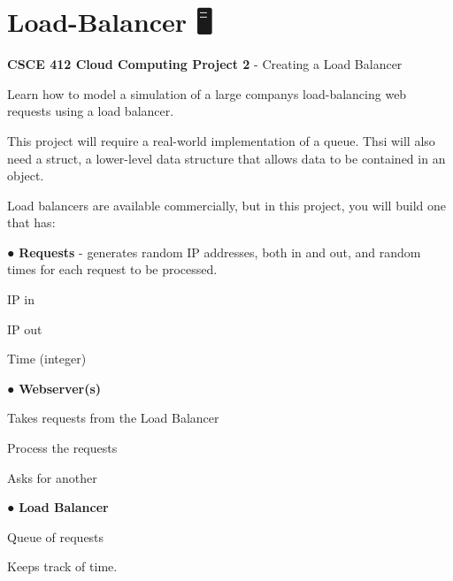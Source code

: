 \chapter{Load-\/\+Balancer 🖥️}
\hypertarget{md__r_e_a_d_m_e}{}\label{md__r_e_a_d_m_e}
\label{md__r_e_a_d_m_e_autotoc_md0}%
%
{\bfseries{CSCE 412 Cloud Computing Project 2}} -\/ Creating a Load Balancer

Learn how to model a simulation of a large company\textquotesingle{}s load-\/balancing web requests using a load balancer.

This project will require a real-\/world implementation of a queue. Thsi will also need a struct, a lower-\/level data structure that allows data to be contained in an object.

Load balancers are available commercially, but in this project, you will build one that has\+:

● {\bfseries{Requests}} -\/ generates random IP addresses, both in and out, and random times for each request to be processed.
\begin{DoxyItemize}
\item IP in
\item IP out
\item Time (integer) ~\newline

\end{DoxyItemize}

● {\bfseries{Webserver(s)}}
\begin{DoxyItemize}
\item Takes requests from the Load Balancer
\item Process the requests
\item Asks for another
\end{DoxyItemize}

● {\bfseries{Load Balancer}}
\begin{DoxyItemize}
\item Queue of requests
\item Keeps track of time. 
\end{DoxyItemize}